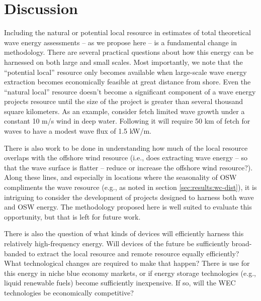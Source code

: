 \section{Discussion} \label{sec:discussion}

Including the natural or potential local resource in estimates of total theoretical wave energy assessments -- as we propose here -- is a fundamental change in methodology. There are several practical questions about how this energy can be harnessed on both large and small scales. 
Most importantly, we note that the ``potential local'' resource only becomes available when large-scale wave energy extraction becomes economically feasible at great distance from shore. Even the ``natural local'' resource doesn't become a significant component of a wave energy projects resource until the size of the project is greater than several thousand square kilometers. As an example, consider fetch limited wave growth under a constant 10 m/s wind in deep water. Following \citet{donelan1980similarity} it will require 50 km of fetch for waves to have a modest wave flux of 1.5 kW/m. 

There is also work to be done in understanding how much of the local resource overlaps with the offshore wind resource (i.e., does extracting wave energy -- so that the wave surface is flatter -- reduce or increase the offshore wind resource?). Along these lines, and especially in locations where the seasonality of OSW compliments the wave resource (e.g., as noted in section \ref{sec:results:wc-dist}), it is intriguing to consider the development of projects designed to harness both wave and OSW energy. The methodology proposed here is well suited to evaluate this opportunity, but that is left for future work.

There is also the question of what kinds of devices will efficiently harness this relatively high-frequency energy. 
Will devices of the future be sufficiently broad-banded to extract the local resource and remote resource equally efficiently? 
What technological changes are required to make that happen? There is use for this energy in niche blue economy markets, or if energy storage technologies (e.g., liquid renewable fuels) become sufficiently inexpensive. If so, will the WEC technologies be economically competitive? 

